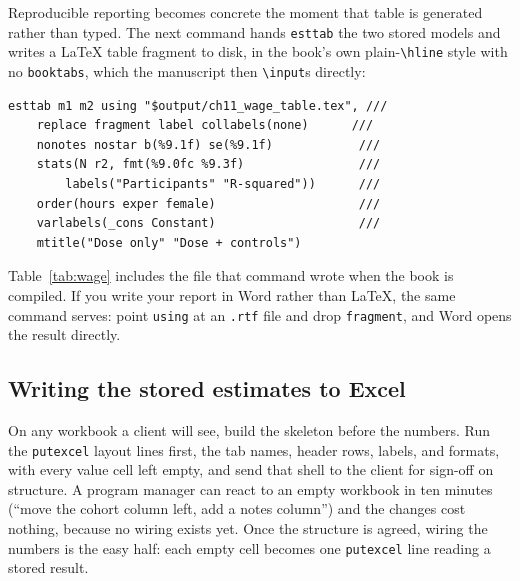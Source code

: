\documentclass[
    a4paper,
    fontsize=10pt,
    twoside=true,
    numbers=noenddot,
]{kaobook}
\begin{document}
Reproducible reporting becomes concrete the moment that table is generated rather than typed. The next command hands \texttt{esttab} the two stored models and writes a \LaTeX{} table fragment to disk, in the book's own plain-\texttt{\textbackslash hline} style with no \texttt{booktabs}, which the manuscript then \texttt{\textbackslash input}s directly:
\par
{\footnotesize
\begin{verbatim}
esttab m1 m2 using "$output/ch11_wage_table.tex", ///
    replace fragment label collabels(none)      ///
    nonotes nostar b(%9.1f) se(%9.1f)            ///
    stats(N r2, fmt(%9.0fc %9.3f)                ///
        labels("Participants" "R-squared"))      ///
    order(hours exper female)                    ///
    varlabels(_cons Constant)                    ///
    mtitle("Dose only" "Dose + controls")
\end{verbatim}
}
Table~\ref{tab:wage} includes the file that command wrote when the book is compiled. If you write your report in Word rather than \LaTeX{}, the same command serves: point \texttt{using} at an \texttt{.rtf} file and drop \texttt{fragment}, and Word opens the result directly.

\begin{table}[htbp]
\centering
\caption[Reproducible earnings table, ingested from a do-file]{Program earnings model for a simulated workforce cohort (seed \texttt{20260704}). OLS coefficients with standard errors in parentheses; earnings are dollars per quarter. \textbf{This table is not typed:} \texttt{ch11\_tables.do} estimated the two models and wrote this exact \texttt{tabular} with \texttt{esttab}; the book ingests it with \texttt{\textbackslash input\{ch11\_wage\_table.tex\}}. Rerun the do-file and the numbers here update on the next compile.}
\label{tab:wage}

\end{table}


\subsection{Writing the stored estimates to Excel}\label{sec:ch11-excel-tab}
On any workbook a client will see, build the skeleton before the numbers. Run the \texttt{putexcel} layout lines first, the tab names, header rows, labels, and formats, with every value cell left empty, and send that shell to the client for sign-off on structure. A program manager can react to an empty workbook in ten minutes (\enquote{move the cohort column left, add a notes column}) and the changes cost nothing, because no wiring exists yet. Once the structure is agreed, wiring the numbers is the easy half: each empty cell becomes one \texttt{putexcel} line reading a stored result.
\end{document}
